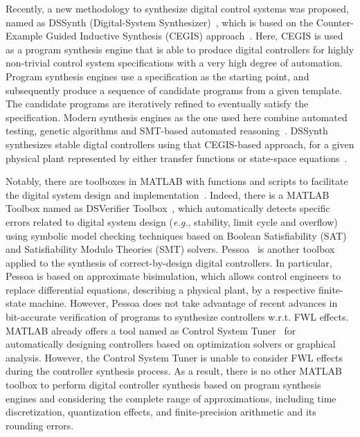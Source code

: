 \documentclass[10pt,conference]{IEEEtran}
\begin{document}
Recently, a new methodology to synthesize digital control systems was proposed, 
named as DSSynth (Digital-System Synthesizer)~\cite{abate2017, abatecav2017}, 
which is based on the Counter-Example Guided Inductive Synthesis 
(CEGIS) approach~\cite{DBLP:conf/asplos/Solar-LezamaTBSS06}. Here, CEGIS is used
as a program synthesis engine that is able to produce digital controllers for highly non-trivial 
control system specifications with a very high degree of automation. Program synthesis engines 
use a specification as the starting point, and subsequently produce a sequence of candidate 
programs from a given template. The candidate programs are iteratively refined to eventually 
satisfy the specification. Modern synthesis engines as the one used here combine automated testing, genetic algorithms 
and SMT-based automated reasoning~\cite{DBLP:journals/corr/AlurFSS16a, DBLP:conf/lpar/DavidKL15}. 
DSSynth synthesizes stable digtal controllers using that CEGIS-based approach,
for a given physical plant represented by either transfer functions or state-space equations~\cite{abate2017,abatecav2017}.

Notably, there are toolboxes in MATLAB with functions and scripts to facilitate the 
digital system design and implementation~\cite{matlab-toolbox}. Indeed, there is a MATLAB 
Toolbox named as DSVerifier Toolbox~\cite{issta2017}, which automatically detects 
specific errors related to digital system design ({\it e.g.}, stability, limit cycle and overflow) 
using symbolic model checking techniques based on Boolean Satisfiability (SAT) and 
Satisfiability Modulo Theories (SMT) solvers. Pessoa~\cite{mazo2010pessoa} is another 
toolbox applied to the synthesis of correct-by-design digital controllers. 
In particular, Pessoa is based on approximate bisimulation, which allows control engineers to replace differential equations, 
describing a physical plant, by a respective finite-state machine. However, Pessoa does not take advantage of
recent advances in bit-accurate verification of programs to synthesize controllers w.r.t. FWL effects. MATLAB already offers a tool 
named as Control System Tuner~\cite{autotuner} for automatically designing controllers based on optimization solvers or graphical analysis. 
However, the Control System Tuner is unable to consider FWL effects during the controller synthesis process.
As a result, there is no other MATLAB toolbox to perform digital controller synthesis based on 
program synthesis engines and considering the complete range of approximations, including time discretization, 
quantization effects, and finite-precision arithmetic and its rounding errors. 
\end{document}
